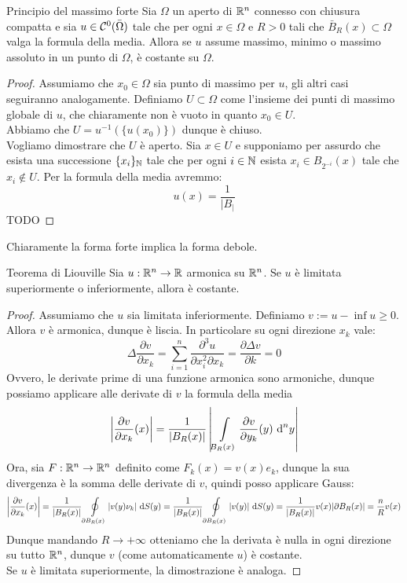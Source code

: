 \documentclass{book}
\begin{document}
\begin{theorem}{Principio del massimo forte}{}
    Sia $\Omega$ un aperto di $\mathbb{R}^n$ connesso con chiusura compatta e sia $u \in \mathcal{C}^0(\bar{\Omega})$ tale che per ogni $x\in\Omega$ e $R>0$ tali che $\bar{B}_R(x)\subset \Omega$ valga la formula della media. Allora se $u$ assume massimo, minimo o massimo assoluto in un punto di $\Omega$, è costante su $\Omega$.
\end{theorem}
\begin{proof}
    Assumiamo che $x_0 \in \Omega$ sia punto di massimo per $u$, gli altri casi seguiranno analogamente. Definiamo $U\subset \Omega$ come l'insieme dei punti di massimo globale di $u$, che chiaramente non è vuoto in quanto $x_0\in U$.\\
    Abbiamo che $U = u^{-1}(\{u(x_0)\})$ dunque è chiuso.\\
    Vogliamo dimostrare che $U$ è aperto. Sia $x\in U$ e supponiamo per assurdo che esista una successione $\{x_i\}_{\mathbb{N}}$ tale che per ogni $i \in \mathbb{N}$ esista $x_i \in B_{2^{-i}}(x)$ tale che $x_i\notin U$. Per la formula della media avremmo:
    \[u(x) = \frac{1}{|B_|}\]
    TODO
\end{proof}

\begin{remark}{}{}
    Chiaramente la forma forte implica la forma debole.
\end{remark}

\begin{theorem}{Teorema di Liouville}{}
    Sia $u:\mathbb{R}^n\to\mathbb{R}$ armonica su $\mathbb{R}^n$. Se $u$ è limitata superiormente o inferiormente, allora è costante.
\end{theorem}
\begin{proof}
    Assumiamo che $u$ sia limitata inferiormente. Definiamo $v := u-\inf u \ge 0$. Allora $v$ è armonica, dunque è liscia. In particolare su ogni direzione $x_k$ vale:
    \[\Delta \frac{\partial v}{\partial x_k} =\sum_{i = 1}^n \frac{\partial^3 u}{\partial x_i^2 \partial x_k} = \frac{\partial \Delta v}{\partial k} = 0\]
    Ovvero, le derivate prime di una funzione armonica sono armoniche, dunque possiamo applicare alle derivate di $v$ la formula della media
    \[\left|\frac{\partial v}{\partial x_k}(x)\right| =\frac{1}{|B_R(x)|}\left| \int\limits_{B_R(x)}\frac{\partial v}{\partial y_k}(y) \text{ d}^n y\right|\]
    Ora, sia $F : \mathbb{R}^n\to\mathbb{R}^n$ definito come $F_k(x) = v(x)e_k$, dunque la sua divergenza è la somma delle derivate di $v$, quindi posso applicare Gauss:
    \[\left|\frac{\partial v}{\partial x_k}(x)\right| = \frac{1}{|B_R(x)|} \oint\limits_{\partial B_R(x)}|v(y) \nu_k |\text{ d} S(y) = \frac{1}{|B_R(x)|} \oint\limits_{\partial B_R(x)}|v(y)|\text{ d} S(y) = \frac{1}{|B_R(x)|} v(x) |\partial B_R(x)| = \frac{n}{R}v(x)\]
    Dunque mandando $R\to +\infty$ otteniamo che la derivata è nulla in ogni direzione su tutto $\mathbb{R}^n$, dunque $v$ (come automaticamente $u$) è costante.\\
    Se $u$ è limitata superiormente, la dimostrazione è analoga.
\end{proof}
\end{document}
